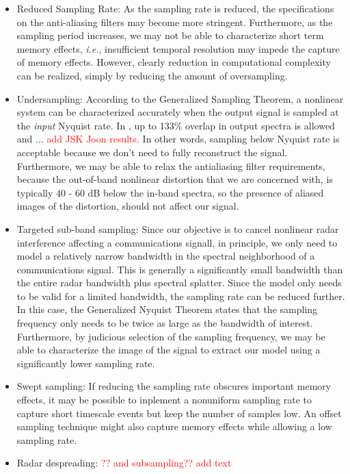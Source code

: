 \begin{itemize}
\item Reduced Sampling Rate:  As the sampling rate is reduced, the specifications on the anti-aliasing filters may become more stringent.  Furthermore, as the sampling period increases, we may not be able to characterize short term memory effects, \emph{i.e.}, insufficient temporal resolution may impede the capture of memory effects.  However, clearly reduction in computational complexity can be realized, simply by reducing the amount of oversampling.
\item Undersampling:  According to the Generalized Sampling Theorem, a nonlinear system can be characterized accurately when the output signal is sampled at the \emph{input} Nyquist rate\cite{Tsimbinos94}.  In \cite{Park02Adap}, up to 133\% overlap in output spectra is allowed and ... \textcolor{red}{ add JSK Joon results.}   In other words, sampling below Nyquist rate is acceptable because we don't need to fully reconstruct the signal.  Furthermore, we may be able to relax the antialiasing filter requirements, because the out-of-band nonlinear distortion that we are concerned with, is typically 40 - 60 dB below the in-band spectra, so the presence of aliased images of the distortion, should not affect our signal. 
\item Targeted sub-band sampling:  Since our objective is to cancel nonlinear radar interference affecting a communications signall, in principle, we only need to model a relatively narrow bandwidth in the spectral neighborhood of a communications signal.  This is generally a significantly small bandwidth than the entire radar bandwidth plus spectral splatter.  Since the model only needs to be valid for a limited bandwidth, the sampling rate can be reduced further.  In this case, the Generalized Nyquist Theorem states that the sampling frequency only needs to be twice as large as the bandwidth of interest.  Furthermore, by judicious selection of the sampling frequency, we may be able to  characterize the image of the signal to extract our model using a significantly lower sampling rate.
\item Swept sampling:  If reducing the sampling rate obscures important memory effects, it may be possible to inplement a nonuniform sampling rate to capture short timescale events but keep the number of samples low.  An offset sampling technique might also capture memory effects while allowing a low sampling rate.
\item Radar despreading: \textcolor{red}{?? and subsampling??}  \textcolor{red}{add text}
\end{itemize}

